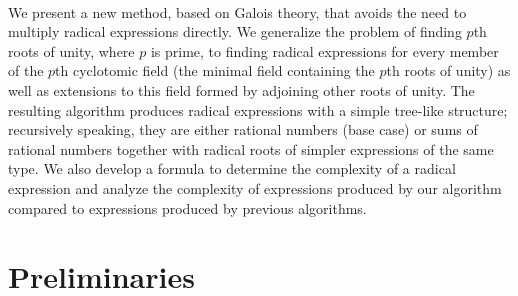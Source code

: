 \documentclass{article}
\begin{document}
    \\
    We present a new method, based on Galois theory, that avoids the need to multiply radical expressions directly. We generalize the problem of finding $ p $th roots of unity, where $ p $ is prime, to finding radical expressions for every member of the $ p $th cyclotomic field (the minimal field containing the $ p $th roots of unity) as well as extensions to this field formed by adjoining other roots of unity. The resulting algorithm produces radical expressions with a simple tree-like structure; recursively speaking, they are either rational numbers (base case) or sums of rational numbers together with radical roots of simpler expressions of the same type. We also develop a formula to determine the complexity of a radical expression and analyze the complexity of expressions produced by our algorithm compared to expressions produced by previous algorithms.\\
\section{Preliminaries}
\end{document}
